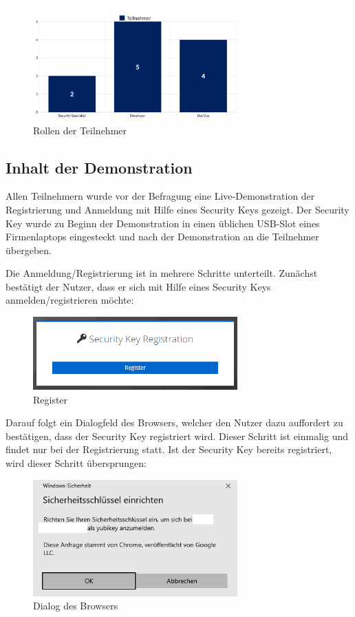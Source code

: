 \begin{figure}[h]
	\centering 
	\includegraphics[width=0.7\textwidth]{img/abbildungen/chart_rollen.png}
	\captionsetup{format=hang}
	\caption{Rollen der Teilnehmer} \label{roles}
\end{figure}

\subsection{Inhalt der Demonstration}
Allen Teilnehmern wurde vor der Befragung eine Live-Demonstration der Registrierung und Anmeldung mit Hilfe eines Security Keys gezeigt. Der Security Key wurde zu Beginn der Demonstration in einen üblichen USB-Slot eines Firmenlaptops eingesteckt und nach der Demonstration an die Teilnehmer übergeben. 

Die Anmeldung/Registrierung ist in mehrere Schritte unterteilt. Zunächst bestätigt der Nutzer, dass er sich mit Hilfe eines Security Keys anmelden/registrieren möchte:

\begin{figure}[h]
	\centering 
	\includegraphics[width=0.7\textwidth]{img/abbildungen/reg001.png}
	\captionsetup{format=hang}
	\caption{Register}
\end{figure}

Darauf folgt ein Dialogfeld des Browsers, welcher den Nutzer dazu auffordert zu bestätigen, dass der Security Key registriert wird. Dieser Schritt ist einmalig und findet nur bei der Registrierung statt. Ist der Security Key bereits registriert, wird dieser Schritt übersprungen:

\begin{figure}[H]
	\centering 
	\includegraphics[width=0.7\textwidth]{img/abbildungen/reg002.png}
	\captionsetup{format=hang}
	\caption{Dialog des Browsers}
\end{figure}

